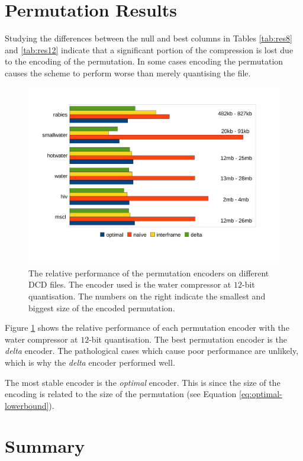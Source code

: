\documentclass[a4paper]{report}
\begin{document}
\section{Permutation Results}

Studying the differences between the null and best columns in Tables
\ref{tab:res8} and \ref{tab:res12} indicate that a significant portion of the
compression is lost due to the encoding of the permutation. In some cases
encoding the permutation causes the scheme to perform worse than merely
quantising the file.

\begin{figure}[h]
\centering
\includegraphics[trim = 10mm 30mm 10mm 18mm, clip, width=\textwidth]{images/perm}
\caption{The relative performance of the permutation encoders on different DCD
  files. The encoder used is the water compressor at $12$-bit
  quantisation. The numbers on the right indicate the smallest and biggest
  size of the encoded permutation.}
\label{fig:perm}
\end{figure}

Figure \ref{fig:perm} shows the relative performance of each permutation
encoder with the water compressor at $12$-bit quantisation. The best
permutation encoder is the \emph{delta} encoder. The pathological cases which
cause poor performance are unlikely, which is why the \emph{delta} encoder
performed well.

The most stable encoder is the \emph{optimal} encoder. This is since the size
of the encoding is related to the size of the permutation (see Equation
\ref{eq:optimal-lowerbound}).


\section{Summary}
\label{sec:summary}
\end{document}
